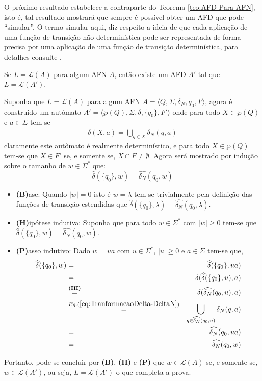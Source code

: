O próximo resultado estabelece a contraparte do Teorema \ref{teo:AFD-Para-AFN}, isto é, tal resultado mostrará que sempre é possível obter um AFD que pode ``simular''. O termo simular aqui, diz respeito a ideia de que cada aplicação de uma função de transição não-determinística pode ser representada de forma precisa por uma aplicação de uma função de transição determinística, para detalhes consulte \cite{hopcroft2008, menezes1998LFA}.

\begin{teorema}\label{teo:AFN-Para-AFD}
	Se $L = \mathcal{L}(A)$ para algum AFN $A$, então existe um AFD $A'$ tal que $L = \mathcal{L}(A')$.
\end{teorema}

\begin{prova}
	Suponha que $L = \mathcal{L}(A)$ para algum AFN $A = \langle Q, \Sigma, \delta_N, q_0, F\rangle$, agora é construído um  autômato $A' = \langle \wp(Q), \Sigma, \delta, \{q_0\}, F' \rangle$ onde para todo $X \in \wp(Q)$ e $a \in \Sigma$ tem-se
	\begin{eqnarray}\label{eq:TranformacaoDelta-DeltaN}
		\delta(X, a) = \bigcup_{q \in X} \delta_N(q, a)
	\end{eqnarray}
	claramente este autômato é realmente determinístico, e para todo $X \in \wp(Q)$  tem-se que $X \in F'$ se, e somente se, $X \cap F \neq \emptyset$. Agora será mostrado por indução sobre o tamanho de $w \in \Sigma^*$ que:
	$$\widehat{\delta}(\{q_0\}, w) = \widehat{\delta_N}(q_0, w)$$
	\begin{itemize}
		\item[ ] \textbf{(B)}ase: Quando $|w| = 0$ isto é $w = \lambda$ tem-se trivialmente pela definição das funções de transição estendidas que $\widehat{\delta}(\{q_0\}, \lambda) = \widehat{\delta_N}(q_0, \lambda)$.
		
		\item[ ] \textbf{(H)}ipótese indutiva: Suponha que para todo $w \in \Sigma^*$ com $|w| \geq 0$ tem-se que $\widehat{\delta}(\{q_0\}, w) = \widehat{\delta_N}(q_0, w)$.
		\item[ ] \textbf{(P)}asso indutivo: Dado $w = ua$ com $u \in \Sigma^*$, $|u| \geq 0$ e $a \in \Sigma$ tem-se que, 
		\begin{eqnarray*}
			\widehat{\delta}(\{q_0\}, w) & = & \widehat{\delta}(\{q_0\}, ua)\\
			& = & \delta(\widehat{\delta}(\{q_0\}, u), a)\\
			& \stackrel{\textbf{(HI)}}{=} & \delta(\widehat{\delta_N}(q_0, u), a)\\
			& \stackrel{Eq. (\ref{eq:TranformacaoDelta-DeltaN})}{=} & \bigcup_{q \in \widehat{\delta_N}(q_0, u)} \delta_N(q, a)\\
			& = & \widehat{\delta_N}(q_0, ua)\\
			& = & \widehat{\delta_N}(q_0, w)
		\end{eqnarray*}
	\end{itemize}
	Portanto, pode-se concluir por \textbf{(B)}, \textbf{(H)} e \textbf{(P)} que $w \in \mathcal{L}(A)$ se, e somente se, $w \in \mathcal{L}(A')$, ou seja, $L = \mathcal{L}(A')$ o que completa a prova.
\end{prova}

